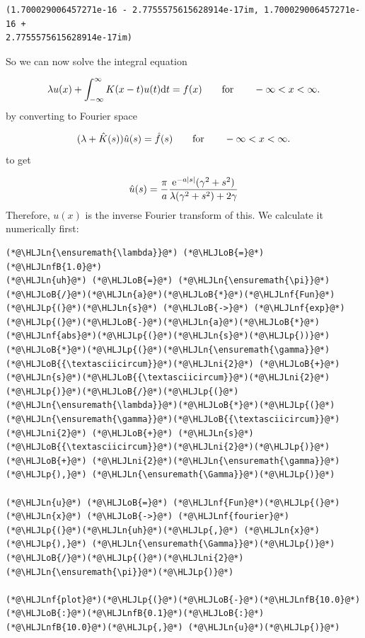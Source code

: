 \documentclass[12pt,a4paper]{article}
\newcommand{\HLJLn}[1]{#1}
\newcommand{\HLJLnf}[1]{\textcolor[RGB]{66,102,213}{#1}}
\newcommand{\HLJLnfB}[1]{\textcolor[RGB]{59,151,46}{#1}}
\newcommand{\HLJLni}[1]{\textcolor[RGB]{59,151,46}{#1}}
\newcommand{\HLJLoB}[1]{\textcolor[RGB]{102,102,102}{\textbf{#1}}}
\newcommand{\HLJLp}[1]{#1}
\def\qqfor{\qquad\hbox{for}\qquad}
\def\D{ {\rm d} }
\def\E{ {\rm e} }
\def\dt{\D t}
\begin{document}
\begin{lstlisting}
(1.700029006457271e-16 - 2.7755575615628914e-17im, 1.700029006457271e-16 + 
2.7755575615628914e-17im)
\end{lstlisting}


So we can now solve the integral equation

\[
\lambda u(x) + \int_{-\infty}^\infty K(x-t)u(t) \dt = f(x)\qqfor -\infty < x < \infty.
\]
by converting to Fourier space

\[
(\lambda + \hat K(s)) \hat u(s)  = \hat f(s)\qqfor -\infty < x < \infty.
\]
to get

\[
\hat u(s) = {\pi \over a} { \E^{-a |s|} (\gamma^2+s^2) \over \lambda (\gamma^2+s^2) + 2\gamma} 
\]
Therefore, $u(x)$ is the inverse Fourier transform of this. We calculate it numerically first:


\begin{lstlisting}
(*@\HLJLn{\ensuremath{\lambda}}@*) (*@\HLJLoB{=}@*) (*@\HLJLnfB{1.0}@*)
(*@\HLJLn{uh}@*) (*@\HLJLoB{=}@*) (*@\HLJLn{\ensuremath{\pi}}@*)(*@\HLJLoB{/}@*)(*@\HLJLn{a}@*)(*@\HLJLoB{*}@*)(*@\HLJLnf{Fun}@*)(*@\HLJLp{(}@*)(*@\HLJLn{s}@*) (*@\HLJLoB{->}@*) (*@\HLJLnf{exp}@*)(*@\HLJLp{(}@*)(*@\HLJLoB{-}@*)(*@\HLJLn{a}@*)(*@\HLJLoB{*}@*)(*@\HLJLnf{abs}@*)(*@\HLJLp{(}@*)(*@\HLJLn{s}@*)(*@\HLJLp{))}@*)(*@\HLJLoB{*}@*)(*@\HLJLp{(}@*)(*@\HLJLn{\ensuremath{\gamma}}@*)(*@\HLJLoB{{\textasciicircum}}@*)(*@\HLJLni{2}@*) (*@\HLJLoB{+}@*) (*@\HLJLn{s}@*)(*@\HLJLoB{{\textasciicircum}}@*)(*@\HLJLni{2}@*)(*@\HLJLp{)}@*)(*@\HLJLoB{/}@*)(*@\HLJLp{(}@*)(*@\HLJLn{\ensuremath{\lambda}}@*)(*@\HLJLoB{*}@*)(*@\HLJLp{(}@*)(*@\HLJLn{\ensuremath{\gamma}}@*)(*@\HLJLoB{{\textasciicircum}}@*)(*@\HLJLni{2}@*) (*@\HLJLoB{+}@*) (*@\HLJLn{s}@*)(*@\HLJLoB{{\textasciicircum}}@*)(*@\HLJLni{2}@*)(*@\HLJLp{)}@*) (*@\HLJLoB{+}@*) (*@\HLJLni{2}@*)(*@\HLJLn{\ensuremath{\gamma}}@*)(*@\HLJLp{),}@*) (*@\HLJLn{\ensuremath{\Gamma}}@*)(*@\HLJLp{)}@*)

(*@\HLJLn{u}@*) (*@\HLJLoB{=}@*) (*@\HLJLnf{Fun}@*)(*@\HLJLp{(}@*)(*@\HLJLn{x}@*) (*@\HLJLoB{->}@*) (*@\HLJLnf{fourier}@*)(*@\HLJLp{(}@*)(*@\HLJLn{uh}@*)(*@\HLJLp{,}@*) (*@\HLJLn{x}@*)(*@\HLJLp{),}@*) (*@\HLJLn{\ensuremath{\Gamma}}@*)(*@\HLJLp{)}@*)(*@\HLJLoB{/}@*)(*@\HLJLp{(}@*)(*@\HLJLni{2}@*)(*@\HLJLn{\ensuremath{\pi}}@*)(*@\HLJLp{)}@*)

(*@\HLJLnf{plot}@*)(*@\HLJLp{(}@*)(*@\HLJLoB{-}@*)(*@\HLJLnfB{10.0}@*)(*@\HLJLoB{:}@*)(*@\HLJLnfB{0.1}@*)(*@\HLJLoB{:}@*)(*@\HLJLnfB{10.0}@*)(*@\HLJLp{,}@*) (*@\HLJLn{u}@*)(*@\HLJLp{)}@*)
\end{lstlisting}
\end{document}
